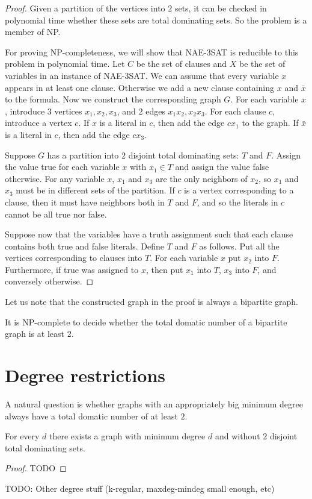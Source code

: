 \begin{proof}
  Given a partition of the vertices into $2$ sets, it can be checked in polynomial
  time whether these sets are total dominating sets. So the problem is a member
  of NP.

  For proving NP-completeness, we will show that NAE-3SAT is reducible to this problem
  in polynomial time. Let $C$ be the set of clauses and $X$ be the set of variables
  in an instance of NAE-3SAT. We can assume that every variable $x$ appears in at least
  one clause. Otherwise we add a new clause containing $x$ and $\bar{x}$ to
  the formula. Now we construct the corresponding graph $G$. For each variable $x$,
  introduce $3$ vertices $x_1, x_2, x_3$, and $2$ edges $x_1x_2, x_2x_3$. For each
  clause $c$, introduce a vertex $c$. If $x$ is a literal in $c$, then add the edge
  $cx_1$ to the graph. If $\bar{x}$ is a literal in $c$, then add the edge $cx_3$.

  Suppose $G$ has a partition into $2$ disjoint total dominating sets: $T$ and $F$.
  Assign the value true for each variable $x$ with $x_1 \in T$ and assign the value
  false otherwise. For any variable $x$, $x_1$ and $x_3$ are the only neighbors
  of $x_2$, so $x_1$ and $x_3$ must be in different sets of the partition. If $c$
  is a vertex corresponding to a clause, then it must have neighbors both in $T$
  and $F$, and so the literals in $c$ cannot be all true nor false.

  Suppose now that the variables have a truth assignment such that each clause
  contains both true and false literals. Define $T$ and $F$ as follows. Put all
  the vertices corresponding to clauses into $T$. For each variable $x$ put $x_2$
  into $F$. Furthermore, if true was assigned to $x$, then put $x_1$ into $T$, $x_3$
  into $F$, and conversely otherwise.
\end{proof}

Let us note that the constructed graph in the proof is always a bipartite
graph.

\begin{cor}
  It is NP-complete to decide whether the total domatic number of
  a bipartite graph is at least $2$.
\end{cor}

\section{Degree restrictions}

A natural question is whether graphs with an appropriately big minimum degree
always have a total domatic number of at least $2$.

\begin{thm}
  For every $d$ there exists a graph with minimum degree $d$ and without $2$
  disjoint total dominating sets.
\end{thm}
\begin{proof}
  TODO
\end{proof}

TODO: Other degree stuff (k-regular, maxdeg-mindeg small enough, etc)
